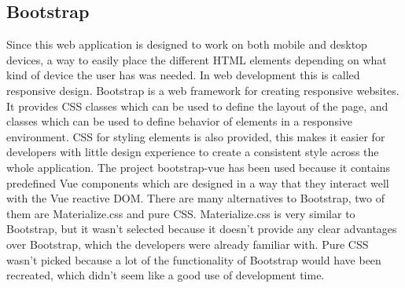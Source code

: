 \subsection{Bootstrap}
Since this web application is designed to work on both mobile and desktop devices, a way to easily place the different HTML elements depending on what kind of device the user has was needed. In web development this is called responsive design. Bootstrap\cite{Bootstrap:Info} is a web framework for creating responsive websites. It provides CSS classes which can be used to define the layout of the page, and classes which can be used to define behavior of elements in a responsive environment. CSS for styling elements is also provided, this makes it easier for developers with little design experience to create a consistent style across the whole application. The project bootstrap-vue\cite{BootstrapVue:Info} has been used because it contains predefined Vue components which are designed in a way that they interact well with the Vue reactive DOM. There are many alternatives to Bootstrap, two of them are Materialize.css and pure CSS. Materialize.css is very similar to Bootstrap, but it wasn't selected because it doesn't provide any clear advantages over Bootstrap, which the developers were already familiar with. Pure CSS wasn't picked because a lot of the functionality of Bootstrap would have been recreated, which didn't seem like a good use of development time.